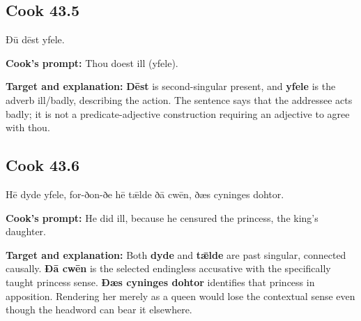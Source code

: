 \par\begin{minipage}{\linewidth}\raggedright
\subsection*{Cook 43.5}

Ðū dēst yfele.

\textbf{Cook's prompt:} Thou doest ill (yfele).

\textbf{Target and explanation:} \textbf{Dēst} is second-singular present, and \textbf{yfele} is the adverb ill/\allowbreak{}badly, describing the action. The sentence says that the addressee acts badly; it is not a predicate-adjective construction requiring an adjective to agree with thou.

\end{minipage}\par\addvspace{4pt}

\par\begin{minipage}{\linewidth}\raggedright
\subsection*{Cook 43.6}

Hē dyde yfele, for-ðon-ðe hē tǣlde ðā cwēn, ðæs cyninges dohtor.

\textbf{Cook's prompt:} He did ill, because he censured the princess, the king’s daughter.

\textbf{Target and explanation:} Both \textbf{dyde} and \textbf{tǣlde} are past singular, connected causally. \textbf{Ðā cwēn} is the selected endingless accusative with the specifically taught princess sense. \textbf{Ðæs cyninges dohtor} identifies that princess in apposition. Rendering her merely as a queen would lose the contextual sense even though the headword can bear it elsewhere.

\end{minipage}\par\addvspace{4pt}

